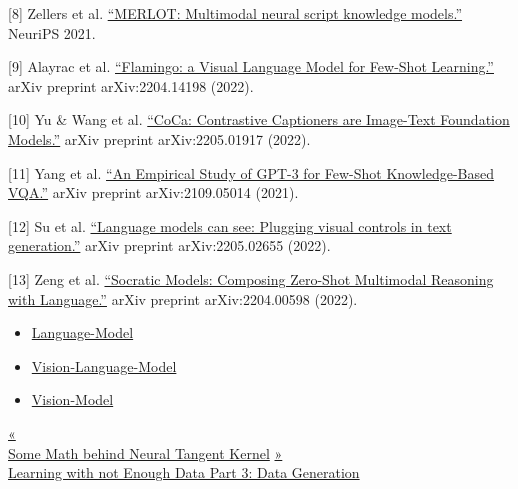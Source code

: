 {[}8{]} Zellers et al. \href{https://arxiv.org/abs/2106.02636}{``MERLOT: Multimodal neural script knowledge models.''} NeuriPS 2021.

{[}9{]} Alayrac et al. \href{https://arxiv.org/abs/2204.14198}{``Flamingo: a Visual Language Model for Few-Shot Learning.''} arXiv preprint arXiv:2204.14198 (2022).

{[}10{]} Yu \& Wang et al. \href{https://arxiv.org/abs/2205.01917}{``CoCa: Contrastive Captioners are Image-Text Foundation Models.''} arXiv preprint arXiv:2205.01917 (2022).

{[}11{]} Yang et al. \href{https://arxiv.org/abs/2109.05014}{``An Empirical Study of GPT-3 for Few-Shot Knowledge-Based VQA.''} arXiv preprint arXiv:2109.05014 (2021).

{[}12{]} Su et al. \href{https://arxiv.org/abs/2205.02655}{``Language models can see: Plugging visual controls in text generation.''} arXiv preprint arXiv:2205.02655 (2022).

{[}13{]} Zeng et al. \href{https://arxiv.org/abs/2204.00598}{``Socratic Models: Composing Zero-Shot Multimodal Reasoning with Language.''} arXiv preprint arXiv:2204.00598 (2022).

\begin{itemize}
\tightlist
\item
  \href{https://lilianweng.github.io/tags/language-model/}{Language-Model}
\item
  \href{https://lilianweng.github.io/tags/vision-language-model/}{Vision-Language-Model}
\item
  \href{https://lilianweng.github.io/tags/vision-model/}{Vision-Model}
\end{itemize}

\href{https://lilianweng.github.io/posts/2022-09-08-ntk/}{{« }\\
{Some Math behind Neural Tangent Kernel}} \href{https://lilianweng.github.io/posts/2022-04-15-data-gen/}{{ »}\\
{Learning with not Enough Data Part 3: Data Generation}}

